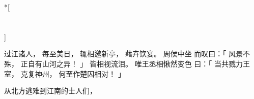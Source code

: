 
\switchcolumn[0]*[\section{}]

过江诸人，
每至美日，
辄相邀新亭，
藉卉饮宴。
周侯中坐
而叹曰：「
    风景不殊，
    正自有山河之异！
」
皆相视流泪。
唯王丞相愀然变色
曰：「
    当共戮力王室，
    克复神州，
    何至作楚囚相对！
」

\switchcolumn


从北方逃难到江南的士人们，
